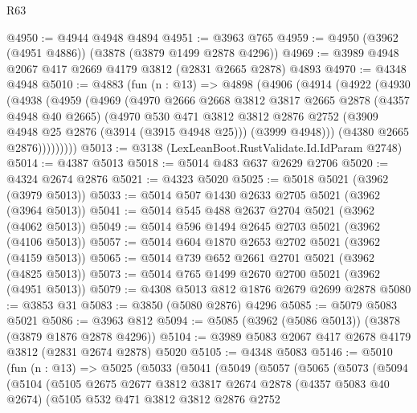 \begin{lexlean}{R63}
\begin{coremodule}
@4950 := @4944 @4948 @4894
@4951 := @3963 @765
@4959 := @4950 (@3962 (@4951 @4886)) (@3878 (@3879 @1499 @2878 @4296))
@4969 := @3989 @4948 @2067 @417 @2669 @4179 @3812 (@2831 @2665 @2878) @4893
@4970 := @4348 @4948
@5010 := @4883
    (fun (n : @13) =>
    @4898
      (@4906
        (@4914
          (@4922
            (@4930
              (@4938
                (@4959
                  (@4969
                    (@4970
                      @2666
                      @2668
                      @3812
                      @3817
                      @2665
                      @2878
                      (@4357 @4948 @40 @2665)
                      (@4970
                        @530
                        @471
                        @3812
                        @3812
                        @2876
                        @2752
                        (@3909 @4948 @25 @2876 (@3914 (@3915 @4948 @25)))
                        (@3999 @4948)))
                    (@4380 @2665 @2876)))))))))
@5013 := @3138 (LexLeanBoot.RustValidate.Id.IdParam @2748)
@5014 := @4387 @5013
@5018 := @5014 @483 @637 @2629 @2706
@5020 := @4324 @2674 @2876
@5021 := @4323 @5020
@5025 := @5018 @5021 (@3962 (@3979 @5013))
@5033 := @5014 @507 @1430 @2633 @2705 @5021 (@3962 (@3964 @5013))
@5041 := @5014 @545 @488 @2637 @2704 @5021 (@3962 (@4062 @5013))
@5049 := @5014 @596 @1494 @2645 @2703 @5021 (@3962 (@4106 @5013))
@5057 := @5014 @604 @1870 @2653 @2702 @5021 (@3962 (@4159 @5013))
@5065 := @5014 @739 @652 @2661 @2701 @5021 (@3962 (@4825 @5013))
@5073 := @5014 @765 @1499 @2670 @2700 @5021 (@3962 (@4951 @5013))
@5079 := @4308 @5013 @812 @1876 @2679 @2699 @2878
@5080 := @3853 @31
@5083 := @3850 (@5080 @2876) @4296
@5085 := @5079 @5083 @5021
@5086 := @3963 @812
@5094 := @5085 (@3962 (@5086 @5013)) (@3878 (@3879 @1876 @2878 @4296))
@5104 := @3989 @5083 @2067 @417 @2678 @4179 @3812 (@2831 @2674 @2878) @5020
@5105 := @4348 @5083
@5146 := @5010
    (fun (n : @13) =>
    @5025
      (@5033
        (@5041
          (@5049
            (@5057
              (@5065
                (@5073
                  (@5094
                    (@5104
                      (@5105
                        @2675
                        @2677
                        @3812
                        @3817
                        @2674
                        @2878
                        (@4357 @5083 @40 @2674)
                        (@5105
                          @532
                          @471
                          @3812
                          @3812
                          @2876
                          @2752

\end{coremodule}
\end{lexlean}
